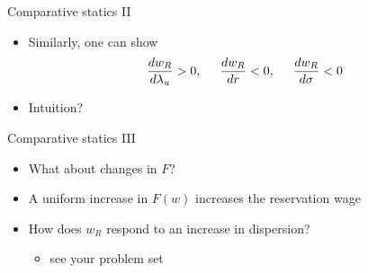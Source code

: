 \documentclass[9pt]{beamer}
\newcommand{\bit}{\begin{itemize}}
\newcommand{\eit}{\end{itemize}}
\begin{document}
\begin{frame}{Comparative statics II}

\bit
\setlength\itemsep{1em}


\item Similarly, one can show
\begin{eqnarray}
\frac{dw_R}{d\lambda_u} > 0, \hspace{5 mm } \frac{dw_R}{d r} < 0 \nonumber, \hspace{5 mm }  \frac{dw_R}{d\sigma} < 0
\end{eqnarray}

\item Intuition?
\eit


\end{frame}


\begin{frame}{Comparative statics III}

\bit
\setlength\itemsep{2em}

\item What about changes in $F$?

\item A uniform increase in $F(w)$ increases the reservation wage

\item How does $w_R$ respond to an increase in dispersion? 
\bit
	\item see your problem set
\eit


\eit


\end{frame}

%
%
%
%
%
%
%
%
\end{document}
